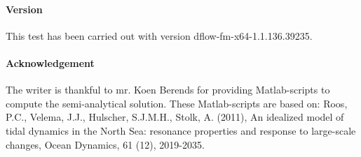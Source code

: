 \paragraph*{Version}
This test has been carried out with version dflow-fm-x64-1.1.136.39235.


\paragraph*{Acknowledgement}
The writer is thankful to mr. Koen Berends for providing Matlab-scripts to compute the semi-analytical solution. These Matlab-scripts are based on: Roos, P.C., Velema, J.J., Hulscher, S.J.M.H., Stolk, A. (2011), An idealized model of tidal dynamics in the North Sea: resonance properties and response to large-scale changes, Ocean Dynamics, 61 (12), 2019-2035.


